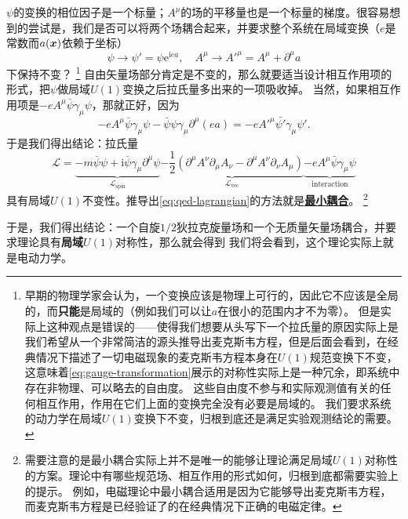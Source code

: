 \documentclass[UTF8, a4paper]{ctexart}
\newcommand*{\ee}{\mathrm{e}}
\newcommand*{\ii}{\mathrm{i}}
\renewcommand{\emph}[1]{\textbf{#1}}
\newcommand*{\concept}[1]{\underline{\textbf{#1}}}
\begin{document}
$\psi$的变换的相位因子是一个标量；$A^\mu$的场的平移量也是一个标量的梯度。很容易想到的尝试是，我们是否可以将两个场耦合起来，并要求整个系统在局域变换（$e$是常数而$a(\vb*{x})$依赖于坐标）
\begin{equation}
    \psi \longrightarrow \psi' = \psi \ee^{\ii e a}, \quad A^\mu \longrightarrow A'^\mu = A^\mu + \partial^\mu a
    \label{eq:gauge-transformation}
\end{equation}
下保持不变？%
\footnote{早期的物理学家会认为，一个变换应该是物理上可行的，因此它不应该是全局的，而\emph{只能}是局域的（例如我们可以让$a$在很小的范围内才不为零）。
但是实际上这种观点是错误的——使得我们想要从头写下一个拉氏量的原因实际上是我们希望从一个非常简洁的源头推导出麦克斯韦方程，但是后面会看到，在经典情况下描述了一切电磁现象的麦克斯韦方程本身在$U(1)$规范变换下不变，这意味着\eqref{eq:gauge-transformation}展示的对称性实际上是一种冗余，即系统中存在非物理、可以略去的自由度。
这些自由度不参与和实际观测值有关的任何相互作用，作用在它们上面的变换完全没有必要是局域的。
我们要求系统的动力学在局域$U(1)$变换下不变，归根到底还是满足实验观测结论的需要。
}%
自由矢量场部分肯定是不变的，那么就要适当设计相互作用项的形式，把$\psi$做局域$U(1)$变换之后拉氏量多出来的一项吸收掉。
当然，如果相互作用项是$- e A^\mu \bar{\psi} \gamma_\mu \psi$，那就正好，因为
\[
    - e A^\mu \bar{\psi} \gamma_\mu \psi - \bar{\psi} \psi \gamma_\mu \partial^\mu (e a) = - e A'^\mu \bar{\psi'} \gamma_\mu \psi'.
\]
于是我们得出结论：拉氏量
\begin{equation}
    \mathcal{L} = 
    \underbrace{- m \bar{\psi} \psi + \ii \bar{\psi} \gamma_\mu \partial^\mu \psi }_{\mathcal{L}_\text{spin}}
    \underbrace{- \frac{1}{2} (\partial^\mu A^\nu \partial_\mu A_\nu - \partial^\mu A^\nu \partial_\nu A_\mu)}_{\mathcal{L}_\text{vec}}
    \underbrace{- e A^\mu \bar{\psi} \gamma_\mu \psi}_\text{interaction}
    \label{eq:qed-lagrangian}
\end{equation}
具有局域$U(1)$不变性。推导出\eqref{eq:qed-lagrangian}的方法就是\concept{最小耦合}。%
\footnote{需要注意的是最小耦合实际上并不是唯一的能够让理论满足局域$U(1)$对称性的方案。理论中有哪些规范场、相互作用的形式如何，归根到底都需要实验上的提示。
例如，电磁理论中最小耦合适用是因为它能够导出麦克斯韦方程，而麦克斯韦方程是已经验证了的在经典情况下正确的电磁定律。}%

于是，我们得出结论：一个自旋$1/2$狄拉克旋量场和一个无质量矢量场耦合，并要求理论具有\emph{局域}$U(1)$对称性，那么就会得到
我们将会看到，这个理论实际上就是电动力学。
\end{document}
